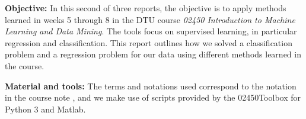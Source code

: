 


\textbf{Objective:} In this second of three reports, the objective is to apply methods learned in weeks 5 through 8 in the DTU course \textit{02450 Introduction to Machine Learning and Data Mining}. The tools focus on supervised learning, in particular regression and classification. This report outlines how we solved a classification problem and a regression problem for our data using different methods learned in the course.

\textbf{Material and tools:} The terms and notations used correspond to the notation in the course note \cite{coursenotes}, and we make use of scripts provided by the 02450Toolbox for Python 3 and Matlab.
